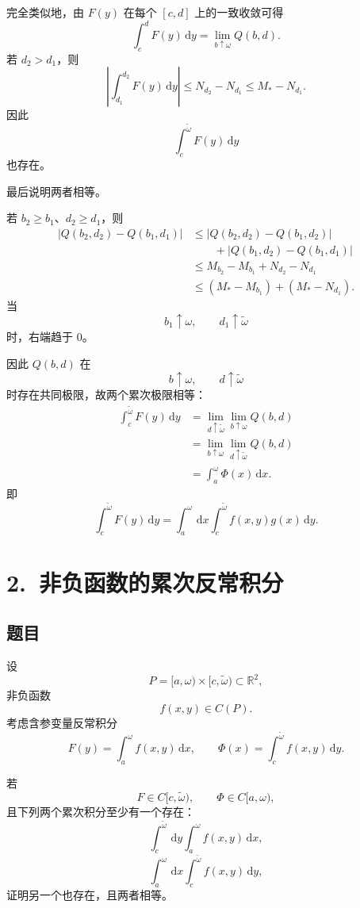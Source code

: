 \documentclass[12pt,a4paper]{ctexart}
\newcommand{\dd}{\,\mathrm d}
\newcommand{\R}{\mathbb R}
\begin{document}
完全类似地，由 \(F(y)\) 在每个
\([c,d]\) 上的一致收敛可得
\[
\int_c^dF(y)\dd y
=
\lim_{b\uparrow\omega}Q(b,d).
\]
若 \(d_2>d_1\)，则
\[
\left|
\int_{d_1}^{d_2}F(y)\dd y
\right|
\le
N_{d_2}-N_{d_1}
\le
M_*-N_{d_1}.
\]
因此
\[
\int_c^{\widetilde\omega}F(y)\dd y
\]
也存在。

最后说明两者相等。

若 \(b_2\ge b_1\)、\(d_2\ge d_1\)，则
\begin{align*}
|Q(b_2,d_2)-Q(b_1,d_1)|
&\le
|Q(b_2,d_2)-Q(b_1,d_2)|\\
&\qquad
+
|Q(b_1,d_2)-Q(b_1,d_1)|\\
&\le
M_{b_2}-M_{b_1}
+
N_{d_2}-N_{d_1}\\
&\le
(M_*-M_{b_1})
+
(M_*-N_{d_1}).
\end{align*}
当
\[
b_1\uparrow\omega,\qquad
d_1\uparrow\widetilde\omega
\]
时，右端趋于 \(0\)。

因此 \(Q(b,d)\) 在
\[
b\uparrow\omega,\qquad
d\uparrow\widetilde\omega
\]
时存在共同极限，故两个累次极限相等：
\begin{align*}
\int_c^{\widetilde\omega}F(y)\dd y
&=
\lim_{d\uparrow\widetilde\omega}
\lim_{b\uparrow\omega}Q(b,d)\\
&=
\lim_{b\uparrow\omega}
\lim_{d\uparrow\widetilde\omega}Q(b,d)\\
&=
\int_a^\omega\Phi(x)\dd x.
\end{align*}
即
\[
\boxed{
\int_c^{\widetilde\omega}F(y)\dd y
=
\int_a^\omega
\dd x
\int_c^{\widetilde\omega}
f(x,y)g(x)\dd y.
}
\]

\section*{2.\ 非负函数的累次反常积分}

\subsection*{题目}

设
\[
P=[a,\omega)\times[c,\widetilde\omega)
\subset\R^2,
\]
非负函数
\[
f(x,y)\in C(P).
\]
考虑含参变量反常积分
\[
F(y)=\int_a^\omega f(x,y)\dd x,
\qquad
\Phi(x)=\int_c^{\widetilde\omega}f(x,y)\dd y.
\]

若
\[
F\in C[c,\widetilde\omega),
\qquad
\Phi\in C[a,\omega),
\]
且下列两个累次积分至少有一个存在：
\[
\int_c^{\widetilde\omega}
\dd y
\int_a^\omega f(x,y)\dd x,
\]
\[
\int_a^\omega
\dd x
\int_c^{\widetilde\omega}f(x,y)\dd y,
\]
证明另一个也存在，且两者相等。
\end{document}

